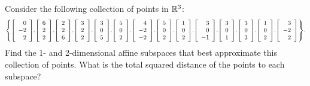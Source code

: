 \documentclass{ximera}
\begin{document}
\begin{problem}
  Consider the following collection of points in $\R^3$:
  \begin{equation*}\scriptstyle
    \set{
      \startmat{r} 0 \\ -2 \\ 2 \stopmat,
      \startmat{r} 6 \\ 2 \\ 2 \stopmat,
      \startmat{r} 2 \\ 2 \\ 6 \stopmat,
      \startmat{r} 3 \\ 2 \\ 2 \stopmat,
      \startmat{r} 3 \\ 0 \\ 5 \stopmat,
      \startmat{r} 5 \\ 0 \\ 2 \stopmat,
      \startmat{r} 4 \\ -2 \\ -2 \stopmat,
      \startmat{r} 5 \\ 0 \\ 2 \stopmat,
      \startmat{r} 1 \\ 0 \\ 2 \stopmat,
      \startmat{r} 3 \\ 0 \\ -1 \stopmat,
      \startmat{r} 3 \\ 0 \\ 1 \stopmat,
      \startmat{r} 3 \\ 0 \\ 3 \stopmat,
      \startmat{r} 1 \\ 0 \\ 2 \stopmat,
      \startmat{r} 3 \\ -2 \\ 2 \stopmat
    }.
  \end{equation*}
  Find the 1- and 2-dimensional affine subspaces that best approximate
  this collection of points. What is the total squared
  distance of the points to each subspace?
\end{problem}
\end{document}
